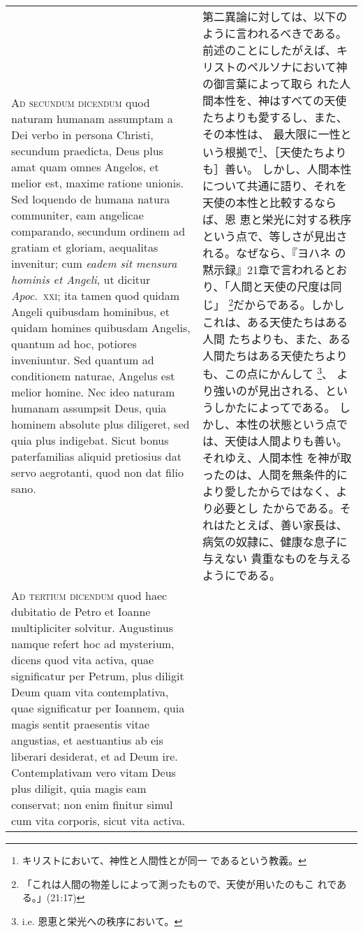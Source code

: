 \documentclass[10pt]{jsarticle} %
\begin{document}
\begin{longtable}{p{21em}p{21em}}
\\


{\scshape Ad secundum dicendum} quod naturam humanam assumptam a Dei
 verbo in persona Christi, secundum praedicta, Deus plus amat quam omnes
 Angelos, et melior est, maxime ratione unionis. Sed loquendo de humana
 natura communiter, eam angelicae comparando, secundum ordinem ad
 gratiam et gloriam, aequalitas invenitur; cum {\itshape eadem sit mensura hominis
 et Angeli}, ut dicitur {\itshape Apoc}.~{\scshape xxi}; ita tamen quod quidam Angeli quibusdam
 hominibus, et quidam homines quibusdam Angelis, quantum ad hoc,
 potiores inveniuntur. Sed quantum ad conditionem naturae, Angelus est
 melior homine. Nec ideo naturam humanam assumpsit Deus, quia hominem
 absolute plus diligeret, sed quia plus indigebat. Sicut bonus
 paterfamilias aliquid pretiosius dat servo aegrotanti, quod non dat
 filio sano.


&

第二異論に対しては、以下のように言われるべきである。
前述のことにしたがえば、キリストのペルソナにおいて神の御言葉によって取ら
 れた人間本性を、神はすべての天使たちよりも愛するし、また、その本性は、
最大限に一性という根拠で\footnote{キリストにおいて、神性と人間性とが同一
 であるという教義。}、［天使たちよりも］善い。
しかし、人間本性について共通に語り、それを天使の本性と比較するならば、恩
 恵と栄光に対する秩序という点で、等しさが見出される。なぜなら、『ヨハネ
 の黙示録』21章で言われるとおり、「人間と天使の尺度は同じ」
 \footnote{「これは人間の物差しによって測ったもので、天使が用いたのもこ
 れである。」(21:17)}だからである。しかしこれは、ある天使たちはある人間
 たちよりも、また、ある人間たちはある天使たちよりも、この点にかんして
 \footnote{i.e. 恩恵と栄光への秩序において。}、
 より強いのが見出される、というしかたによってである。
しかし、本性の状態という点では、天使は人間よりも善い。それゆえ、人間本性
 を神が取ったのは、人間を無条件的により愛したからではなく、より必要とし
 たからである。それはたとえば、善い家長は、病気の奴隷に、健康な息子に与えない
 貴重なものを与えるようにである。

\\


{\scshape Ad tertium dicendum} quod haec dubitatio de Petro et Ioanne
 multipliciter solvitur. Augustinus namque refert hoc ad mysterium,
 dicens quod vita activa, quae significatur per Petrum, plus diligit
 Deum quam vita contemplativa, quae significatur per Ioannem, quia magis
 sentit praesentis vitae angustias, et aestuantius ab eis liberari
 desiderat, et ad Deum ire. Contemplativam vero vitam Deus plus diligit,
 quia magis eam conservat; non enim finitur simul cum vita corporis,
 sicut vita activa. 



\end{longtable}
\end{document}
